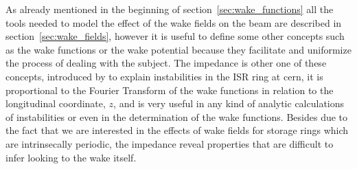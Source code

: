     As already mentioned in the beginning of section~\ref{sec:wake_functions} all the tools needed to model the effect of the wake fields on the beam are described in section~\ref{sec:wake_fields}, however it is useful to define some other concepts such as the wake functions or the wake potential because they facilitate and uniformize the process of dealing with the subject. The impedance is other one of these concepts, introduced by \cite{Vaccaro1966} to explain instabilities in the ISR ring at \gls{cern}, it is proportional to the Fourier Transform of the wake functions in relation to the longitudinal coordinate, $z$, and is very useful in any kind of analytic calculations of instabilities or even in the determination of the wake functions. Besides due to the fact that we are interested in the effects of wake fields for storage rings which are intrinsecally periodic, the impedance reveal properties that are difficult to infer looking to the wake itself.

